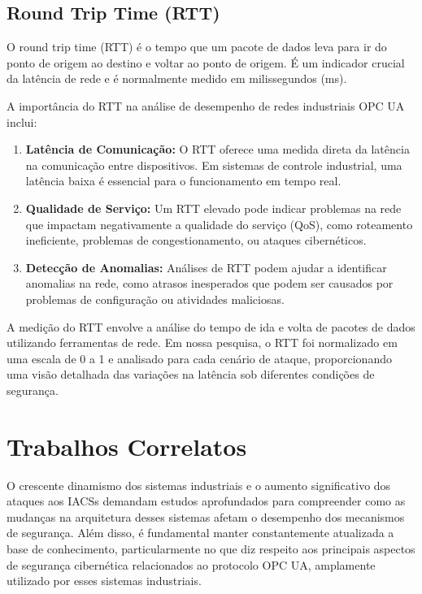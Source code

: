 {    \subsection{Round Trip Time (RTT)}

    O round trip time (RTT) é o tempo que um pacote de dados leva para ir do ponto de origem ao destino e voltar ao ponto de origem. É um indicador crucial da latência de rede e é normalmente medido em milissegundos (ms).

    A importância do RTT na análise de desempenho de redes industriais OPC UA inclui:

    \begin{enumerate}
        \item \textbf{Latência de Comunicação:} O RTT oferece uma medida direta da latência na comunicação entre dispositivos. Em sistemas de controle industrial, uma latência baixa é essencial para o funcionamento em tempo real.
        \item \textbf{Qualidade de Serviço:} Um RTT elevado pode indicar problemas na rede que impactam negativamente a qualidade do serviço (QoS), como roteamento ineficiente, problemas de congestionamento, ou ataques cibernéticos.
        \item \textbf{Detecção de Anomalias:} Análises de RTT podem ajudar a identificar anomalias na rede, como atrasos inesperados que podem ser causados por problemas de configuração ou atividades maliciosas.
    \end{enumerate}

    A medição do RTT envolve a análise do tempo de ida e volta de pacotes de dados utilizando ferramentas de rede. Em nossa pesquisa, o RTT foi normalizado em uma escala de 0 a 1 e analisado para cada cenário de ataque, proporcionando uma visão detalhada das variações na latência sob diferentes condições de segurança.
    }

    \section{Trabalhos Correlatos} \label{sec:trabCorrelatos}

    O crescente dinamismo dos sistemas industriais e o aumento significativo dos ataques aos IACSs demandam estudos aprofundados para compreender como as mudanças na arquitetura desses sistemas afetam o desempenho dos mecanismos de segurança. Além disso, é fundamental manter constantemente atualizada a base de conhecimento, particularmente no que diz respeito aos principais aspectos de segurança cibernética relacionados ao protocolo OPC UA, amplamente utilizado por esses sistemas industriais.

